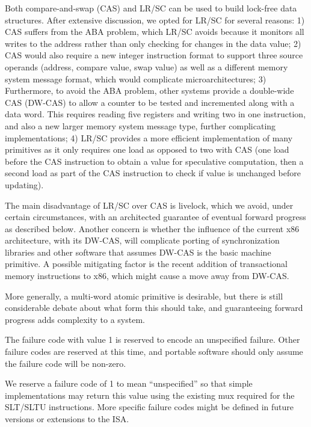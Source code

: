 \begin{commentary}
Both compare-and-swap (CAS) and LR/SC can be used to build lock-free
data structures.  After extensive discussion, we opted for LR/SC for
several reasons: 1) CAS suffers from the ABA problem, which LR/SC
avoids because it monitors all writes to the address rather than
only checking for changes in the data value; 2) CAS would also require
a new integer instruction format to support three source operands
(address, compare value, swap value) as well as a different memory
system message format, which would complicate microarchitectures; 3)
Furthermore, to avoid the ABA problem, other systems provide a
double-wide CAS (DW-CAS) to allow a counter to be tested and
incremented along with a data word. This requires reading five
registers and writing two in one instruction, and also a new larger
memory system message type, further complicating implementations; 4)
LR/SC provides a more efficient implementation of many primitives as
it only requires one load as opposed to two with CAS (one load before
the CAS instruction to obtain a value for speculative computation,
then a second load as part of the CAS instruction to check if value is
unchanged before updating).

The main disadvantage of LR/SC over CAS is livelock, which we avoid,
under certain circumstances,
with an architected guarantee of eventual forward progress as
described below.  Another concern is whether the influence of the
current x86 architecture, with its DW-CAS, will complicate porting of
synchronization libraries and other software that assumes DW-CAS is
the basic machine primitive.  A possible mitigating factor is the
recent addition of transactional memory instructions to x86, which
might cause a move away from DW-CAS.

More generally, a multi-word atomic primitive is desirable, but there is
still considerable debate about what form this should take, and
guaranteeing forward progress adds complexity to a system.
\end{commentary}

The failure code with value 1 is reserved to encode an unspecified
failure.  Other failure codes are reserved at this time, and portable
software should only assume the failure code will be non-zero.

\begin{commentary}
We reserve a failure code of 1 to mean ``unspecified'' so that simple
implementations may return this value using the existing mux required
for the SLT/SLTU instructions.  More specific failure codes might be
defined in future versions or extensions to the ISA.
\end{commentary}

